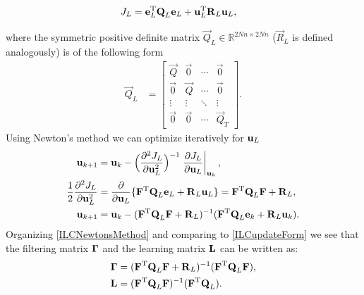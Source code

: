 \begin{equation}
\begin{aligned}
J_L &= \boldsymbol{\mathrm{e}}_L^{\mathrm{T}}\boldsymbol{\mathrm{Q}}_L\boldsymbol{\mathrm{e}}_L + \boldsymbol{\mathrm{u}}_L^{\mathrm{T}}\boldsymbol{\mathrm{R}}_L\boldsymbol{\mathrm{u}}_L,
\end{aligned}
\label{costFunctional}
\end{equation}

\noindent where the symmetric positive definite matrix $\vec{Q}_L \in \mathbb{R}^{2Nn \times 2Nn}$ ($\vec{R}_L$ is defined analogously) is of the following form
%
\begin{equation}
\begin{aligned}
 \vec{Q}_L &= 
 \begin{bmatrix}
  \vec{Q} & \vec{0} & \cdots & \vec{0} \\
  \vec{0} & \vec{Q} & \cdots & \vec{0} \\
  \vdots  & \vdots  & \ddots & \vdots  \\
  \vec{0} & \vec{0} & \cdots & \vec{Q}_T
 \end{bmatrix}.
\end{aligned}
\label{Qmatrix}
\end{equation}
%
\noindent Using Newton's method we can optimize iteratively for $\boldsymbol{\mathrm{u}}_L$
%
\begin{equation}
\begin{aligned}
\boldsymbol{\mathrm{u}}_{k+1} &= \boldsymbol{\mathrm{u}}_k - \Big(\frac{\partial^{2}J_L}{\partial\boldsymbol{\mathrm{u}}^{2}_L}\Big)^{-1}\left.\frac{\partial{J_L}}{\partial{\boldsymbol{\mathrm{u}}_L}}\right|_{\boldsymbol{\mathrm{u}}_k}, \\
\frac{1}{2}\frac{\partial^{2}J_L}{\partial\boldsymbol{\mathrm{u}}^{2}_L} &= \frac{\partial}{\partial\boldsymbol{\mathrm{u}}_L}\{\boldsymbol{\mathrm{F}}^{\mathrm{T}}\boldsymbol{\mathrm{Q}}_L\boldsymbol{\mathrm{e}}_L + \boldsymbol{\mathrm{R}}_L\boldsymbol{\mathrm{u}}_L\} = \boldsymbol{\mathrm{F}}^{\mathrm{T}}\boldsymbol{\mathrm{Q}}_L\boldsymbol{\mathrm{F}} + \boldsymbol{\mathrm{R}}_L, \\
\boldsymbol{\mathrm{u}}_{k+1} &= \boldsymbol{\mathrm{u}}_k - (\boldsymbol{\mathrm{F}}^{\mathrm{T}}\boldsymbol{\mathrm{Q}}_L\boldsymbol{\mathrm{F}} + \boldsymbol{\mathrm{R}}_L)^{-1}(\boldsymbol{\mathrm{F}}^{\mathrm{T}}\boldsymbol{\mathrm{Q}}_L\boldsymbol{\mathrm{e}}_k + \boldsymbol{\mathrm{R}}_L\boldsymbol{\mathrm{u}}_k).
\end{aligned}
\label{ILCNewtonsMethod}
\end{equation}
%
\noindent Organizing \eqref{ILCNewtonsMethod} and comparing to \eqref{ILCupdateForm} we see that the filtering matrix $\boldsymbol{\mathrm{\Gamma}}$ and the learning matrix $\boldsymbol{\mathrm{L}}$ can be written as:
%
\begin{equation}
\begin{aligned}
\boldsymbol{\mathrm{\Gamma}} &= (\boldsymbol{\mathrm{F}}^{\mathrm{T}}\boldsymbol{\mathrm{Q}}_L\boldsymbol{\mathrm{F}} + \boldsymbol{\mathrm{R}}_L)^{-1}(\boldsymbol{\mathrm{F}}^{\mathrm{T}}\boldsymbol{\mathrm{Q}}_L\boldsymbol{\mathrm{F}}),\\
\boldsymbol{\mathrm{L}} &= (\boldsymbol{\mathrm{F}}^{\mathrm{T}}\boldsymbol{\mathrm{Q}}_L\boldsymbol{\mathrm{F}})^{-1}(\boldsymbol{\mathrm{F}}^{\mathrm{T}}\boldsymbol{\mathrm{Q}}_L).
\end{aligned}
\label{qAndlMatrices}
\end{equation}
